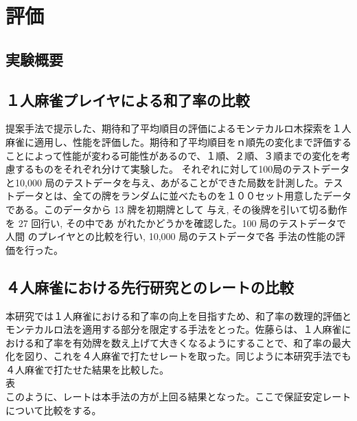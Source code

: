\chapter{評価}
\label{chap:evaluation}
\section{実験概要}
\section{１人麻雀プレイヤによる和了率の比較}
提案手法で提示した、期待和了平均順目の評価によるモンテカルロ木探索を１人麻雀に適用し、性能を評価した。期待和了平均順目をｎ順先の変化まで評価することによって性能が変わる可能性があるので、１順、２順、３順までの変化を考慮するものをそれぞれ分けて実験した。
それぞれに対して100局のテストデータと10,000 局のテストデータを与え、あがることができた局数を計測した。テストデータとは、全ての牌をランダムに並べたものを１００セット用意したデータである。このデータから 13 牌を初期牌として 与え, その後牌を引いて切る動作を 27 回行い, その中であ がれたかどうかを確認した。100 局のテストデータで人間 のプレイヤとの比較を行い, 10,000 局のテストデータで各 手法の性能の評価を行った。


\section{４人麻雀における先行研究とのレートの比較} %
本研究では１人麻雀における和了率の向上を目指すため、和了率の数理的評価とモンテカルロ法を適用する部分を限定する手法をとった。佐藤らは、１人麻雀における和了率を有効牌を数え上げて大きくなるようにすることで、和了率の最大化を図り、これを４人麻雀で打たせレートを取った。同じように本研究手法でも４人麻雀で打たせた結果を比較した。
\\
表
\\
このように、レートは本手法の方が上回る結果となった。ここで保証安定レートについて比較をする。

